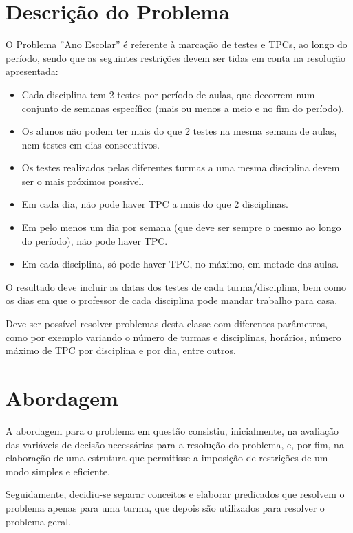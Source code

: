 \documentclass{llncs}
\begin{document}
\newpage
\section{Descrição do Problema}
%

O Problema ''Ano Escolar'' é referente à marcação de testes e TPCs, ao longo do período, sendo que as seguintes restrições devem ser tidas em conta na resolução apresentada:

	\begin{itemize}
	\item Cada disciplina tem 2 testes por período de aulas, que decorrem num conjunto de semanas específico (mais ou menos a meio e no fim do período). 	
	\item Os alunos não podem ter mais do que 2 testes na mesma semana de aulas, nem testes em dias consecutivos.
	\item Os testes realizados pelas diferentes turmas a uma mesma disciplina devem ser o mais próximos possível.
	\item Em cada dia, não pode haver TPC a mais do que 2 disciplinas.
	\item Em pelo menos um dia por semana (que deve ser sempre o mesmo ao longo do
	  período), não pode haver TPC. 
	\item Em cada disciplina, só pode haver TPC, no máximo, em metade das aulas.
	\end{itemize}
O resultado deve incluir as datas dos testes de cada turma/disciplina, bem como os dias em que o professor de cada disciplina pode mandar trabalho para casa.\par
Deve ser possível resolver problemas desta classe com diferentes parâmetros, como por exemplo variando o número de turmas e disciplinas, horários, número máximo de TPC por disciplina e por dia, entre outros.

\section{Abordagem}
%
A abordagem para o problema em questão consistiu, inicialmente, na avaliação das variáveis de decisão necessárias para a resolução do problema, e, por fim, na elaboração de uma estrutura que permitisse a imposição de restrições de um modo simples e eficiente.\par
Seguidamente, decidiu-se separar conceitos e elaborar predicados que resolvem o problema apenas para uma turma, que depois são utilizados para resolver o problema geral.


\newpage
\end{document}
